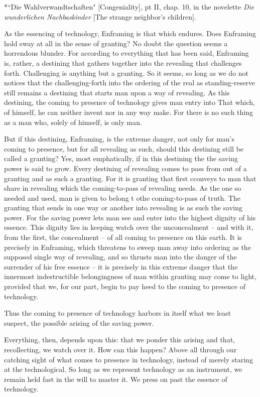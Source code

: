 *``Die Wahlverwandtschaften" [Congeniality], pt II, chap. 10, in the novelette \textit{Die wunderlichen Nachbaskinder} [The strange neighbor's children].

As the essencing of technology, Enframing is that which endures. Does Enframing hold sway at all in the sense of granting? No doubt the question seems a horrendous blunder. For according to everything that has been said, Enframing is, rather, a destining that gathers together into the revealing that challenges forth. Challenging is anything but a granting. So it seems, so long as we do not notices that the challenging-forth into the ordering of the real as standing-reserve still remains a destining that starts man upon a way of revealing. As this destining, the coming to presence of technology gives man entry into That which, of himself, he can neither invent nor in any way make. For there is no such thing as a man who, solely of himself, is only man.

But if this destining, Enframing, is the extreme danger, not only for man's coming to presence, but for all revealing as such, should this destining still be called a granting? Yes, most emphatically, if in this destining the the saving power is said to grow. Every destining of revealing comes to pass from out of a granting and as such a granting. For it is granting that first cconveys to man that share in revealing which the coming-to-pass of revealing needs. As the one so needed and used, man is given to belong t othe coming-to-pass of truth. The granting that sends in one way or another into revealing is as such the saving power. For the saving power lets man see and enter into the highest dignity of his essence. This dignity lies in keeping watch over the unconcealment -- and with it, from the first, the concealment -- of all coming to presence on this earth. It is precisely in Enframing, which threatens to sweep man away into ordering as the supposed single way of revealing, and so thrusts man into the danger of the surrender of his free essence -- it is precisely in this extreme danger that the innermost indestructible belongingness of man within granting may come to light, provided that we, for our part, begin to pay heed to the coming to presence of technology.

Thus the coming to presence of technology harbors in itself what we least suspect, the possible arising of the saving power. 

Everything, then, depends upon this: that we ponder this arising and that, recollecting, we watch over it. How can this happen? Above all through our catching sight of what comes to presence in technology, instead of merely staring at the technological. So long as we represent technology as an instrument, we remain held fast in the will to master it. We press on past the essence of technology.

